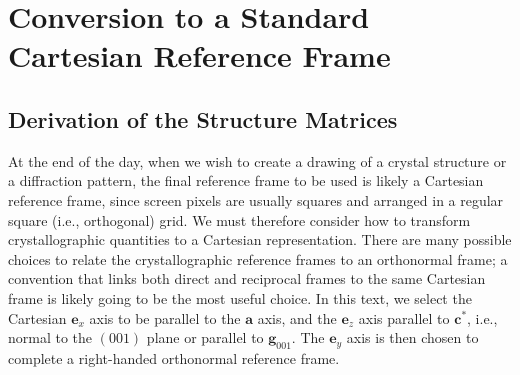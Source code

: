 \section{Conversion to a Standard Cartesian Reference Frame}\label{\chabbr:sec:Cartesian}

\subsection{Derivation of the Structure Matrices}\label{\chabbr:sec:SMderivation}
At the end of the day, when we wish to create a drawing of a crystal structure or a diffraction pattern, the final reference frame to be used is likely a Cartesian reference frame, since screen pixels are usually squares and arranged in a regular square (i.e., orthogonal) grid.  We must therefore consider how to transform crystallographic quantities to a Cartesian representation.  There are many possible choices to relate the crystallographic reference frames to an orthonormal frame; a convention that links both direct and reciprocal frames to the same Cartesian frame is likely going to be the most useful choice.  In this text, we select the Cartesian $\mathbf{e}_x$ axis to be parallel to the $\mathbf{a}$ axis, and the $\mathbf{e}_z$ axis parallel to $\mathbf{c}^{\ast}$, i.e., normal to the $(001)$ plane or parallel to $\mathbf{g}_{001}$.  The $\mathbf{e}_y$ axis is then chosen to complete a right-handed orthonormal reference frame.

